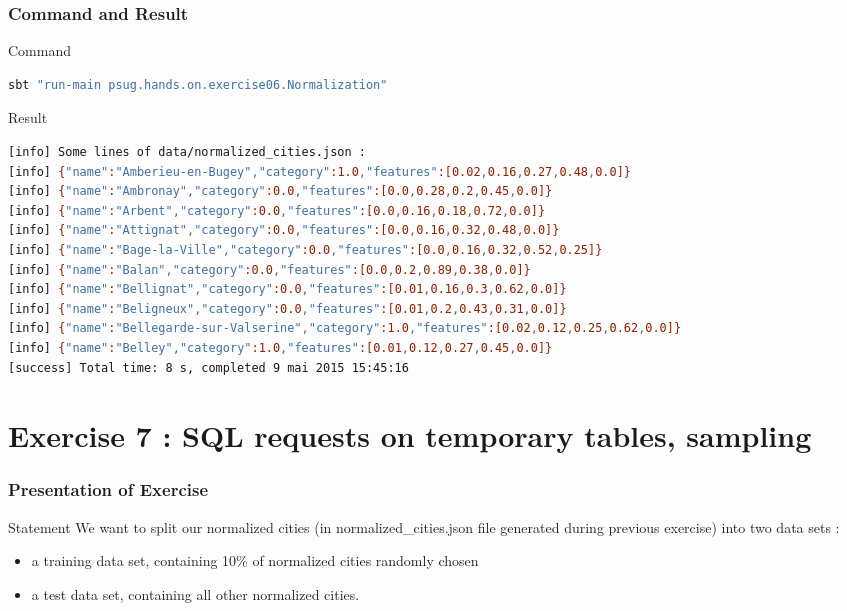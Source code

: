 \documentclass[slidetop,9pt,utf8]{beamer}
\begin{document}
\begin{CJK}{UTF8}{gbsn}
\begin{frame}[fragile]
\end{frame}

\begin{frame}[fragile]
  \frametitle{Command and Result}

  \begin{block}{Command}
    \begin{lstlisting}[language=bash, style=terminal]
sbt "run-main psug.hands.on.exercise06.Normalization"  
    \end{lstlisting}
  \end{block}

  \begin{block}{Result}
    \begin{lstlisting}[language=bash, style=terminal]
[info] Some lines of data/normalized_cities.json : 
[info] {"name":"Amberieu-en-Bugey","category":1.0,"features":[0.02,0.16,0.27,0.48,0.0]}
[info] {"name":"Ambronay","category":0.0,"features":[0.0,0.28,0.2,0.45,0.0]}
[info] {"name":"Arbent","category":0.0,"features":[0.0,0.16,0.18,0.72,0.0]}
[info] {"name":"Attignat","category":0.0,"features":[0.0,0.16,0.32,0.48,0.0]}
[info] {"name":"Bage-la-Ville","category":0.0,"features":[0.0,0.16,0.32,0.52,0.25]}
[info] {"name":"Balan","category":0.0,"features":[0.0,0.2,0.89,0.38,0.0]}
[info] {"name":"Bellignat","category":0.0,"features":[0.01,0.16,0.3,0.62,0.0]}
[info] {"name":"Beligneux","category":0.0,"features":[0.01,0.2,0.43,0.31,0.0]}
[info] {"name":"Bellegarde-sur-Valserine","category":1.0,"features":[0.02,0.12,0.25,0.62,0.0]}
[info] {"name":"Belley","category":1.0,"features":[0.01,0.12,0.27,0.45,0.0]}
[success] Total time: 8 s, completed 9 mai 2015 15:45:16
    \end{lstlisting}
  \end{block}

\end{frame}

\section{Exercise 7 : SQL requests on temporary tables, sampling}

\begin{frame}
  \frametitle{Presentation of Exercise}

  \begin{block}{Statement}
    We want to split our normalized cities (in normalized\_cities.json file generated during previous exercise) into two data sets : 
    \begin{itemize}
      \item a training data set, containing 10\% of normalized cities randomly chosen
      \item a test data set, containing all other normalized cities. 
    \end{itemize}
    

\end{block}
\end{frame}
\end{CJK}
\end{document}
